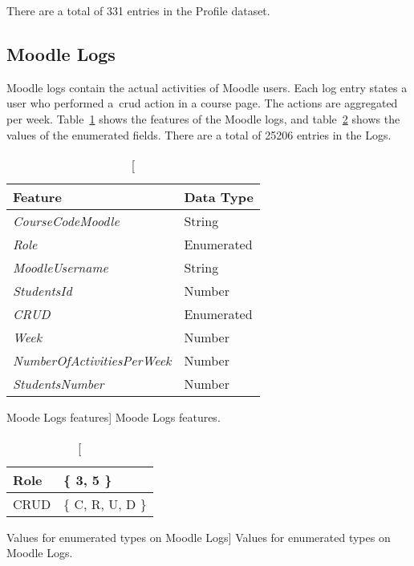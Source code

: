 There are a total of 331 entries in the Profile dataset.

\subsection{Moodle Logs}
\label{sec:logs}

Moodle logs contain the actual activities of Moodle users. Each log entry
states a user who performed a~\gls{crud} action in a course page. The actions
are aggregated per week. Table~\ref{tab:moodle_logs_features} shows the
features of the Moodle logs, and table~\ref{tab:moodle_logs_enum} shows the
values of the enumerated fields. There are a total of 25206 entries in the
Logs.

\begin{table}[h!]
    \centering

    \begin{tabular}{l l}
        Feature                            & Data Type  \\ \hline
        \textit{CourseCodeMoodle}          & String     \\
        \textit{Role}                      & Enumerated \\
        \textit{MoodleUsername}            & String     \\
        \textit{StudentsId}                & Number     \\
        \textit{CRUD}                      & Enumerated \\
        \textit{Week}                      & Number     \\
        \textit{NumberOfActivitiesPerWeek} & Number     \\
        \textit{StudentsNumber}            & Number     \\
    \end{tabular}

    \caption
        [Moode Logs features]
        {Moode Logs features.}

    \label{tab:moodle_logs_features}
\end{table}

\begin{table}[h!]
    \centering

    \begin{tabular}{| l | l |}
        \hline
        Role & \{ 3, 5 \} \\ \hline
        CRUD & \{ C, R, U, D \}  \\ \hline
    \end{tabular}

    \caption
        [Values for enumerated types on Moodle Logs]
        {Values for enumerated types on Moodle Logs.}

    \label{tab:moodle_logs_enum}
\end{table}

